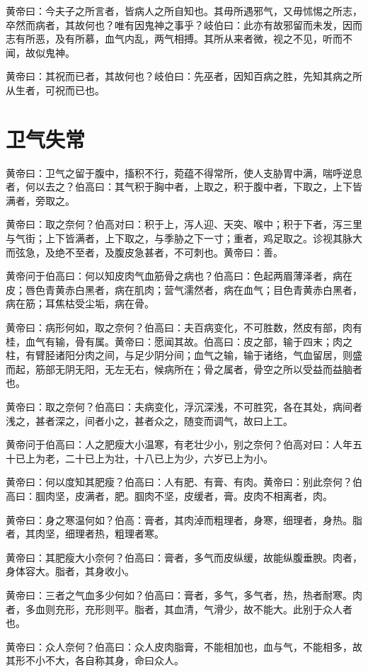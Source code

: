 \documentclass[a4paper,12pt,UTF8,twoside]{ctexbook}
\begin{document}
	黄帝曰：今夫子之所言者，皆病人之所自知也。其毋所遇邪气，又毋怵惕之所志，卒然而病者，其故何也？唯有因鬼神之事乎？岐伯曰：此亦有故邪留而未发，因而志有所恶，及有所慕，血气内乱，两气相搏。其所从来者微，视之不见，听而不闻，故似鬼神。
	
	黄帝曰：其祝而已者，其故何也？岐伯曰：先巫者，因知百病之胜，先知其病之所从生者，可祝而已也。
	\chapter{卫气失常}
	
	黄帝曰：卫气之留于腹中，搐积不行，菀蕴不得常所，使人支胁胃中满，喘呼逆息者，何以去之？伯高曰：其气积于胸中者，上取之，积于腹中者，下取之，上下皆满者，旁取之。
	
	黄帝曰：取之奈何？伯高对曰：积于上，泻人迎、天突、喉中；积于下者，泻三里与气街；上下皆满者，上下取之，与季胁之下一寸；重者，鸡足取之。诊视其脉大而弦急，及绝不至者，及腹皮急甚者，不可刺也。黄帝曰：善。
	
	黄帝问于伯高曰：何以知皮肉气血筋骨之病也？伯高曰：色起两眉薄泽者，病在皮；唇色青黄赤白黑者，病在肌肉；营气濡然者，病在血气；目色青黄赤白黑者，病在筋；耳焦枯受尘垢，病在骨。
	
	黄帝曰：病形何如，取之奈何？伯高曰：夫百病变化，不可胜数，然皮有部，肉有桂，血气有输，骨有属。黄帝曰：愿闻其故。伯高曰：皮之部，输于四末；肉之柱，有臂胫诸阳分肉之间，与足少阴分间；血气之输，输于诸络，气血留居，则盛而起，筋部无阴无阳，无左无右，候病所在；骨之属者，骨空之所以受益而益脑者也。
	
	黄帝曰：取之奈何？伯高曰：夫病变化，浮沉深浅，不可胜究，各在其处，病间者浅之，甚者深之，间者小之，甚者众之，随变而调气，故曰上工。
	
	黄帝问于伯高曰：人之肥瘦大小温寒，有老壮少小，别之奈何？伯高对曰：人年五十已上为老，二十已上为壮，十八已上为少，六岁已上为小。
	
	黄帝曰：何以度知其肥瘦？伯高曰：人有肥、有膏、有肉。黄帝曰：别此奈何？伯高曰：腘肉坚，皮满者，肥。腘肉不坚，皮缓者，膏。皮肉不相离者，肉。
	
	黄帝曰：身之寒温何如？伯高：膏者，其肉淖而粗理者，身寒，细理者，身热。脂者，其肉坚，细理者热，粗理者寒。
	
	黄帝曰：其肥瘦大小奈何？伯高曰：膏者，多气而皮纵缓，故能纵腹垂腴。肉者，身体容大。脂者，其身收小。
	
	黄帝曰：三者之气血多少何如？伯高曰：膏者，多气，多气者，热，热者耐寒。肉者，多血则充形，充形则平。脂者，其血清，气滑少，故不能大。此别于众人者也。
	
	黄帝曰：众人奈何？伯高曰：众人皮肉脂膏，不能相加也，血与气，不能相多，故其形不小不大，各自称其身，命曰众人。
	
\end{document}
